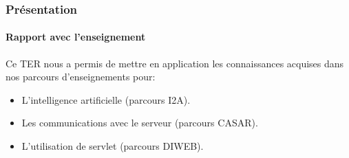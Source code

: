 \begin{frame}
\frametitle{Présentation}
\framesubtitle{Rapport avec l'enseignement}
Ce TER nous a permis de mettre en application les connaissances acquises dans nos parcours d'enseignements  pour: \\

	\begin{itemize}
		\item L'intelligence artificielle (parcours I2A).
		\item Les communications avec le serveur (parcours CASAR).
		\item L'utilisation de servlet (parcours DIWEB).
	\end{itemize} \\
	
\end{frame}



